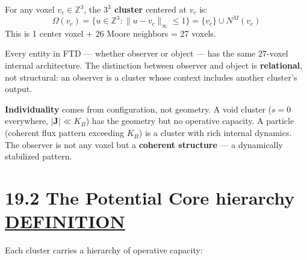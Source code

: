 \documentclass[
  11pt,
  letterpaper,
  twoside,
  openright]{book}
\begin{document}
\begin{ftddefinition}

For any voxel \(v_c \in \mathbb{Z}^3\), the \textbf{\(3^3\) cluster}
centered at \(v_c\) is: \[
\Omega(v_c) = \{ u \in \mathbb{Z}^3 : \|u - v_c\|_\infty \leq 1 \} = \{v_c\} \cup N^M(v_c)
\] This is 1 center voxel + 26 Moore neighbors = 27 voxels.

\end{ftddefinition}

Every entity in FTD --- whether observer or object --- has the same
27-voxel internal architecture. The distinction between observer and
object is \textbf{relational}, not structural: an observer is a cluster
whose context includes another cluster's output.

\textbf{Individuality} comes from configuration, not geometry. A void
cluster (\(s = 0\) everywhere, \(|\mathbf{J}| \ll K_B\)) has the
geometry but no operative capacity. A particle (coherent flux pattern
exceeding \(K_B\)) is a cluster with rich internal dynamics. The
observer is not any voxel but a \textbf{coherent structure} --- a
dynamically stabilized pattern.

\section{\texorpdfstring{19.2 The Potential Core hierarchy
\hyperref[definition]{DEFINITION}}{19.2 The Potential Core hierarchy DEFINITION}}\label{the-potential-core-hierarchy-definition}

Each cluster carries a hierarchy of operative capacity:
\end{document}
